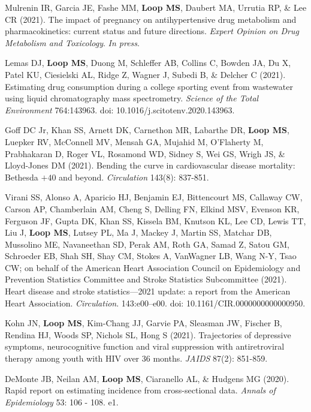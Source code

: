 \documentclass[10pt,letterpaper]{article}
\begin{document}
\begin{etaremune}

\item Mulrenin IR, Garcia JE, Fashe MM, \textbf{Loop MS}, Daubert MA, Urrutia RP, \& Lee CR (2021). The impact of pregnancy on antihypertensive drug metabolism and pharmacokinetics: current status and future directions. \emph{Expert Opinion on Drug Metabolism and Toxicology}. \emph{In press}.

\item Lemas DJ, \textbf{Loop MS}, Duong M, Schleffer AB, Collins C, Bowden JA, Du X, Patel KU, Ciesielski AL, Ridge Z, Wagner J, Subedi B, \& Delcher C (2021). Estimating drug consumption during a college sporting event from wastewater using liquid chromatography mass spectrometry. \emph{Science of the Total Environment} 764:143963. doi: 10.1016/j.scitotenv.2020.143963.

\item Goff DC Jr, Khan SS, Arnett DK, Carnethon MR, Labarthe DR, \textbf{Loop MS}, Luepker RV, McConnell MV, Mensah GA, Mujahid M, O'Flaherty M, Prabhakaran D, Roger VL, Rosamond WD, Sidney S, Wei GS, Wrigh JS, \& Lloyd-Jones DM (2021). Bending the curve in cardiovascular disease mortality: Bethesda $+40$ and beyond. \emph{Circulation} 143(8): 837-851.

\item Virani SS, Alonso A, Aparicio HJ, Benjamin EJ, Bittencourt MS, Callaway CW, Carson AP, Chamberlain AM, Cheng S, Delling FN, Elkind MSV, Evenson KR, Ferguson JF, Gupta DK, Khan SS, Kissela BM, Knutson KL, Lee CD, Lewis TT, Liu J, \textbf{Loop MS}, Lutsey PL, Ma J, Mackey J, Martin SS, Matchar DB, Mussolino ME, Navaneethan SD, Perak AM, Roth GA, Samad Z, Satou GM, Schroeder EB, Shah SH, Shay CM, Stokes A, VanWagner LB, Wang N-Y, Tsao CW; on behalf of the American Heart Association Council on Epidemiology and Prevention Statistics Committee and Stroke Statistics Subcommittee (2021). Heart disease and stroke statistics—2021 update: a report from the American Heart Association. \emph{Circulation}. 143:e00–e00. doi: 10.1161/CIR.0000000000000950.

\item Kohn JN, \textbf{Loop MS}, Kim-Chang JJ, Garvie PA, Sleasman JW, Fischer B, Rendina HJ, Woods SP, Nichols SL, Hong S (2021). Trajectories of depressive symptoms, neurocognitive function and viral suppression with antiretroviral therapy among youth with HIV over 36 months. \emph{JAIDS} 87(2): 851-859.

\item DeMonte JB, Neilan AM, \textbf{Loop MS}, Ciaranello AL, \& Hudgens MG (2020). Rapid report on estimating incidence from cross-sectional data. \emph{Annals of Epidemiology} 53: 106 - 108. e1.


\end{etaremune}
\end{document}
